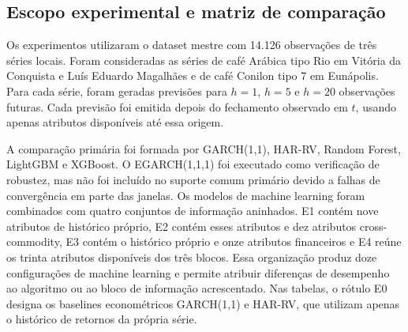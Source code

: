 \documentclass[a4paper,fleqn]{cas-sc}
\begin{document}
\subsection{Escopo experimental e matriz de comparação}
\label{subsec:experimental_scope}

Os experimentos utilizaram o dataset mestre com 14.126 observações de três séries locais. Foram consideradas as séries de café Arábica tipo Rio em Vitória da Conquista e Luís Eduardo Magalhães e de café Conilon tipo 7 em Eunápolis. Para cada série, foram geradas previsões para \(h=1\), \(h=5\) e \(h=20\) observações futuras. Cada previsão foi emitida depois do fechamento observado em \(t\), usando apenas atributos disponíveis até essa origem.

A comparação primária foi formada por GARCH(1,1), HAR-RV, Random Forest, LightGBM e XGBoost. O EGARCH(1,1,1) foi executado como verificação de robustez, mas não foi incluído no suporte comum primário devido a falhas de convergência em parte das janelas. Os modelos de machine learning foram combinados com quatro conjuntos de informação aninhados. E1 contém nove atributos de histórico próprio, E2 contém esses atributos e dez atributos cross-commodity, E3 contém o histórico próprio e onze atributos financeiros e E4 reúne os trinta atributos disponíveis dos três blocos. Essa organização produz doze configurações de machine learning e permite atribuir diferenças de desempenho ao algoritmo ou ao bloco de informação acrescentado. Nas tabelas, o rótulo E0 designa os baselines econométricos GARCH(1,1) e HAR-RV, que utilizam apenas o histórico de retornos da própria série.
\end{document}
